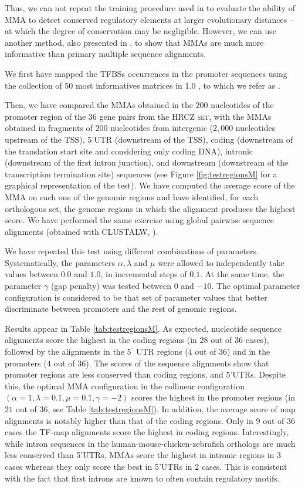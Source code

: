 Thus, we can not repeat the training procedure used in \citep{blanco:2006b}
to evaluate the ability of MMA to detect conserved regulatory elements at
larger evolutionary distances --at which the degree of conservation may
be negligible. However, we can use another method, also presented in
\citep{blanco:2006b}, to show that MMAs are much more informative than
primary multiple sequence alignments.

We first have mapped the TFBSs occurrences in the promoter sequences
using the collection of 50 most informatives matrices in  1.0
\citep{sandelin:2004a}, to which we refer as  \citep{blanco:2006b}.

Then, we have compared the MMAs obtained in the $200$ nucleotides of the
promoter region of the 36 gene pairs from the \textsc{HRCZ set}, with the
MMAs obtained in fragments of $200$ nucleotides from intergenic ($2,000$
nucleotides upstream of the TSS), 5'UTR (downstream of the TSS), coding
(downstream of the translation start site and considering only coding DNA),
intronic (downstream of the first intron junction), and downstream
(downstream of the transcription termination site) sequences (see
Figure \ref{fig:testregionsM} for a graphical representation of the test).
We have computed the average score of the MMA on each one of the genomic
regions and have identified, for each orthologous set, the genome regions
in which the alignment produces the highest score. We have performed the
same exercise using global pairwise sequence alignments (obtained with
CLUSTALW, \citep{thompson:1994a}).

We have repeated this test using different combinations of parameters.
Systematically, the parameters $\alpha, \lambda$ and $\mu$ were allowed
to independently take values between $0.0$ and $1.0$, in incremental steps
of $0.1$. At the same time, the parameter $\gamma$ (gap penalty) was
tested between $0$ and $-10$. The optimal parameter configuration is 
considered to be that set of parameter values that better discriminate 
between promoters and the rest of genomic regions.

Results appear in Table \ref{tab:testregionsM}. As expected, nucleotide sequence
alignments score the highest in the coding regions (in $28$ out of $36$
cases), followed by the alignments in the 5$^\prime$ UTR regions ($4$
out of $36$) and in the promoters ($4$ out of $36$). The scores of the
sequence alignments show that promoter regions are less conserved than
coding regions, and 5'UTRs. Despite this, the optimal MMA configuration
in the collinear configuration $(\alpha=1,\lambda=0.1,\mu=0.1,\gamma=-2)$
scores the highest in the promoter regions (in $21$ out of $36$, see Table \ref{tab:testregionsM}).
In addition, the average score of map alignments is notably higher than that of
the coding regions. Only in $9$ out of $36$ cases the TF-map alignments score
the highest in coding regions. Interestingly, while intron sequences in the
human-mouse-chicken-zebrafish orthologs are much less conserved than 5'UTRs,
MMAs score the highest in intronic regions in $3$ cases whereas they only
score the best in 5'UTRs in $2$ cases. This is consistent with the fact that
first introns are known to often contain regulatory motifs.

